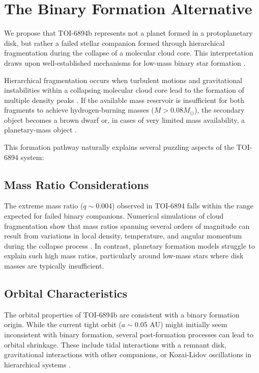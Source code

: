 \documentclass[12pt]{article}
\begin{document}
\section{The Binary Formation Alternative}

We propose that TOI-6894b represents not a planet formed in a protoplanetary disk, but rather a failed stellar companion formed through hierarchical fragmentation during the collapse of a molecular cloud core. This interpretation draws upon well-established mechanisms for low-mass binary star formation \citep{bate2009fragmentation, offner2010formation}.

Hierarchical fragmentation occurs when turbulent motions and gravitational instabilities within a collapsing molecular cloud core lead to the formation of multiple density peaks \citep{larson1969numerical, boss1999evolution}. If the available mass reservoir is insufficient for both fragments to achieve hydrogen-burning masses ($M > 0.08 M_{\odot}$), the secondary object becomes a brown dwarf or, in cases of very limited mass availability, a planetary-mass object \citep{whitworth2007brown, luhman2012brown}.

This formation pathway naturally explains several puzzling aspects of the TOI-6894 system:

\subsection{Mass Ratio Considerations}

The extreme mass ratio ($q \sim 0.004$) observed in TOI-6894 falls within the range expected for failed binary companions. Numerical simulations of cloud fragmentation show that mass ratios spanning several orders of magnitude can result from variations in local density, temperature, and angular momentum during the collapse process \citep{bate2012stellar, offner2014impact}. In contrast, planetary formation models struggle to explain such high mass ratios, particularly around low-mass stars where disk masses are typically insufficient.

\subsection{Orbital Characteristics}

The orbital properties of TOI-6894b are consistent with a binary formation origin. While the current tight orbit ($a \sim 0.05$ AU) might initially seem inconsistent with binary formation, several post-formation processes can lead to orbital shrinkage. These include tidal interactions with a remnant disk, gravitational interactions with other companions, or Kozai-Lidov oscillations in hierarchical systems \citep{kozai1962secular, naoz2016eccentric}.
\end{document}
